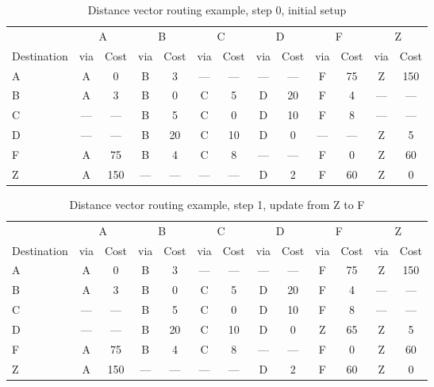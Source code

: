 
\begin{table}
    \caption{Distance vector  routing example, step 0, initial setup }
    \label{tab:dv:step:0}
\begin{tabular}{l|c|c|c|c|c|c|c|c|c|c|c|c}
    \toprule
      & \multicolumn{2}{c|}{A}&\multicolumn{2}{c|}{B}&\multicolumn{2}{c|}{C}&\multicolumn{2}{c|}{D}&\multicolumn{2}{c|}{F}&\multicolumn{2}{c|}{Z} \\
    Destination & via&Cost&via&Cost&via&Cost&via&Cost&via&Cost&via&Cost \\ 
    \midrule
    A & A & 0 &B & 3 &--- & ---&--- & ---&F & 75 &Z & 150 
 \\B & A & 3 &B & 0 &C & 5 &D & 20 &F & 4 &--- & ---
 \\C & --- & ---&B & 5 &C & 0 &D & 10 &F & 8 &--- & ---
 \\D & --- & ---&B & 20 &C & 10 &D & 0 &--- & ---&Z & 5 
 \\F & A & 75 &B & 4 &C & 8 &--- & ---&F & 0 &Z & 60 
 \\Z & A & 150 &--- & ---&--- & ---&D & 2 &F & 60 &Z & 0 
    \\ \bottomrule 
\end{tabular}
\end{table}
    

\begin{table}
    \caption{Distance vector  routing example, step 1, update from Z to F }
    \label{tab:dv:step:1}
\begin{tabular}{l|c|c|c|c|c|c|c|c|c|c|c|c}
    \toprule
      & \multicolumn{2}{c|}{A}&\multicolumn{2}{c|}{B}&\multicolumn{2}{c|}{C}&\multicolumn{2}{c|}{D}&\multicolumn{2}{c|}{F}&\multicolumn{2}{c|}{Z} \\
    Destination & via&Cost&via&Cost&via&Cost&via&Cost&via&Cost&via&Cost \\ 
    \midrule
    A & A & 0 &B & 3 &--- & ---&--- & ---&F & 75 &Z & 150 
 \\B & A & 3 &B & 0 &C & 5 &D & 20 &F & 4 &--- & ---
 \\C & --- & ---&B & 5 &C & 0 &D & 10 &F & 8 &--- & ---
 \\D & --- & ---&B & 20 &C & 10 &D & 0 &Z & 65 &Z & 5 
 \\F & A & 75 &B & 4 &C & 8 &--- & ---&F & 0 &Z & 60 
 \\Z & A & 150 &--- & ---&--- & ---&D & 2 &F & 60 &Z & 0 
    \\ \bottomrule 
\end{tabular}
\end{table}
    

